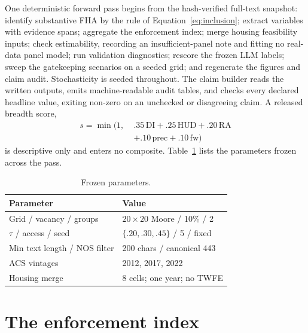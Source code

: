 \documentclass[11pt]{article}
\begin{document}
One deterministic forward pass begins from the hash-verified full-text snapshot: identify substantive FHA by the rule of Equation~\ref{eq:inclusion}; extract variables with evidence spans; aggregate the enforcement index; merge housing feasibility inputs; check estimability, recording an insufficient-panel note and fitting no real-data panel model; run validation diagnostics; rescore the frozen LLM labels; sweep the gatekeeping scenarios on a seeded grid; and regenerate the figures and claim audit. Stochasticity is seeded throughout. The claim builder reads the written outputs, emits machine-readable audit tables, and checks every declared headline value, exiting non-zero on an unchecked or disagreeing claim. A released breadth score,
\begin{equation}\label{eq:breadth}
\begin{split}
s = \min\big(1,\; & .35\,\mathrm{DI} + .25\,\mathrm{HUD} + .20\,\mathrm{RA}\\
                  & + .10\,\mathrm{prec} + .10\,\mathrm{fw}\big)
\end{split}
\end{equation}
is descriptive only and enters no composite. Table~\ref{tab:params} lists the parameters frozen across the pass.

\begin{table}[h]
\centering\small
\setlength{\tabcolsep}{3pt}
\begin{tabular}{ll}
\toprule
Parameter & Value \\
\midrule
Grid / vacancy / groups & $20\times20$ Moore / 10\% / 2 \\
$\tau$ / access / seed & $\{.20,.30,.45\}$ / 5 / fixed \\
Min text length / NOS filter & 200 chars / canonical 443 \\
ACS vintages & 2012, 2017, 2022 \\
Housing merge & 8 cells; one year; no TWFE \\
\bottomrule
\end{tabular}
\caption{Frozen parameters.}
\label{tab:params}
\end{table}

\section{The enforcement index}\label{app:feii}
\end{document}
